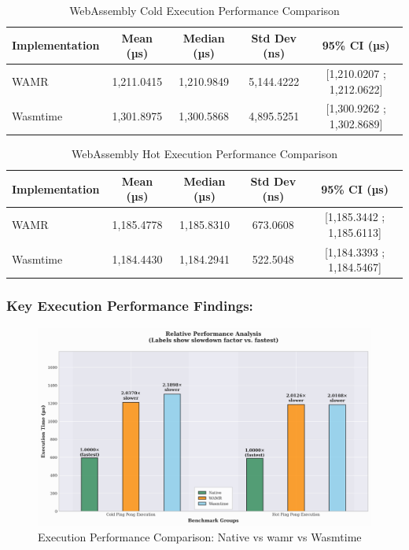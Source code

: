 \begin{table}[h]
    \centering
    \caption{WebAssembly Cold Execution Performance Comparison}
    \label{tab:wasm-execution-cold}
    \begin{tabular}{lcccc}
        \toprule
        \textbf{Implementation} & \textbf{Mean (µs)} & \textbf{Median (µs)} & \textbf{Std Dev (ns)} & \textbf{95\% CI (µs)} \\
        \midrule
        WAMR      & 1,211.0415 & 1,210.9849 & 5,144.4222 & [1,210.0207 ; 1,212.0622] \\
        Wasmtime  & 1,301.8975 & 1,300.5868 & 4,895.5251 & [1,300.9262 ; 1,302.8689] \\
        \bottomrule
    \end{tabular}
\end{table}

\begin{table}[h]
    \centering
    \caption{WebAssembly Hot Execution Performance Comparison}
    \label{tab:wasm-execution-hot}
    \begin{tabular}{lcccc}
        \toprule
        \textbf{Implementation} & \textbf{Mean (µs)} & \textbf{Median (µs)} & \textbf{Std Dev (ns)} & \textbf{95\% CI (µs)} \\
        \midrule
        WAMR      & 1,185.4778 & 1,185.8310 & 673.0608 & [1,185.3442 ; 1,185.6113] \\
        Wasmtime  & 1,184.4430 & 1,184.2941 & 522.5048 & [1,184.3393 ; 1,184.5467] \\
        \bottomrule
    \end{tabular}
\end{table}

\subsubsection{Key Execution Performance Findings:}

\begin{figure}[h]
    \centering
    \includegraphics[width=1.0\textwidth]{images/wasm-execution-relative}
    \caption{Execution Performance Comparison: Native vs \acrshort{wamr} vs Wasmtime}
    \label{fig:wasm-execution-relative}
\end{figure}

